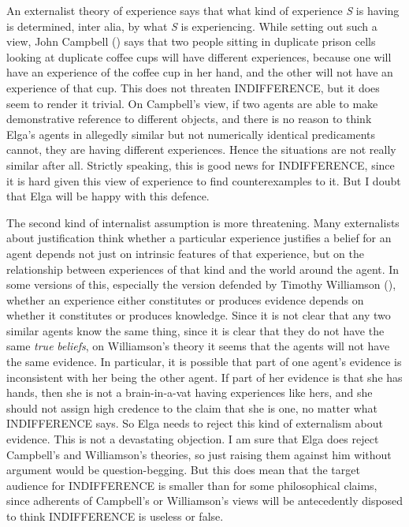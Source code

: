 \documentclass[
  10pt,
  letterpaper,
  DIV=11,
  numbers=noendperiod,
  twoside]{scrartcl}
\begin{document}
An externalist theory of experience says that what kind of experience
\emph{S} is having is determined, inter alia, by what \emph{S} is
experiencing. While setting out such a view, John Campbell
() says that two people
sitting in duplicate prison cells looking at duplicate coffee cups will
have different experiences, because one will have an experience of the
coffee cup in her hand, and the other will not have an experience of
that cup. This does not threaten INDIFFERENCE, but it does seem to
render it trivial. On Campbell's view, if two agents are able to make
demonstrative reference to different objects, and there is no reason to
think Elga's agents in allegedly similar but not numerically identical
predicaments cannot, they are having different experiences. Hence the
situations are not really similar after all. Strictly speaking, this is
good news for INDIFFERENCE, since it is hard given this view of
experience to find counterexamples to it. But I doubt that Elga will be
happy with this defence.

The second kind of internalist assumption is more threatening. Many
externalists about justification think whether a particular experience
justifies a belief for an agent depends not just on intrinsic features
of that experience, but on the relationship between experiences of that
kind and the world around the agent. In some versions of this,
especially the version defended by Timothy Williamson
(), whether an experience
either constitutes or produces evidence depends on whether it
constitutes or produces knowledge. Since it is not clear that any two
similar agents know the same thing, since it is clear that they do not
have the same \emph{true} \emph{beliefs}, on Williamson's theory it
seems that the agents will not have the same evidence. In particular, it
is possible that part of one agent's evidence is inconsistent with her
being the other agent. If part of her evidence is that she has hands,
then she is not a brain-in-a-vat having experiences like hers, and she
should not assign high credence to the claim that she is one, no matter
what INDIFFERENCE says. So Elga needs to reject this kind of externalism
about evidence. This is not a devastating objection. I am sure that Elga
does reject Campbell's and Williamson's theories, so just raising them
against him without argument would be question-begging. But this does
mean that the target audience for INDIFFERENCE is smaller than for some
philosophical claims, since adherents of Campbell's or Williamson's
views will be antecedently disposed to think INDIFFERENCE is useless or
false.
\end{document}
